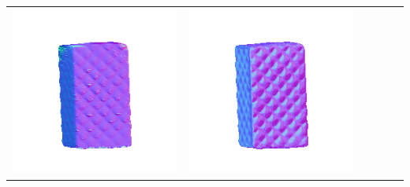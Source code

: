 \begin{center}
\begin{tabularx}{\linewidth}{@{}Y@{}Y@{}Y@{}Y@{}Y@{}Y@{}}
\includegraphics[width=\linewidth]{semisynthetic/20150514_18_yu_out.png} &
\includegraphics[width=\linewidth]{semisynthetic/20150514_18_dpsn_out.png} &

\end{tabularx}
\end{center}
